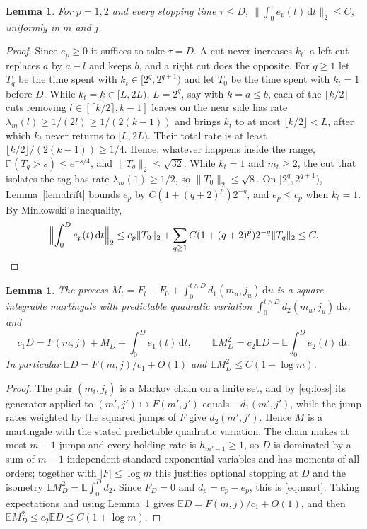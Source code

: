 \documentclass[11pt]{amsart}
\newtheorem{lemma}[theorem]{Lemma}
\theoremstyle{remark}
\numberwithin{equation}{section}
\newcommand{\E}{\mathbb E}
\newcommand{\Pp}{\mathbb P}
\newcommand{\dd}{\,\mathrm d}
\begin{document}
\begin{lemma}\label{lem:errors}
For $p=1,2$ and every stopping time $\tau\le D$, $\bigl\|\int_0^\tau e_p(t)\dd t\bigr\|_2\le C$, uniformly in $m$ and $j$.
\end{lemma}

\begin{proof}
Since $e_p\ge0$ it suffices to take $\tau=D$. A cut never increases $k_t$: a left cut replaces $a$ by $a-l$ and keeps $b$, and a right cut does the opposite. For $q\ge1$ let $T_q$ be the time spent with $k_t\in[2^q,2^{q+1})$ and let $T_0$ be the time spent with $k_t=1$ before $D$. While $k_t=k\in[L,2L)$, $L=2^q$, say with $k=a\le b$, each of the $\lfloor k/2\rfloor$ cuts removing $l\in[\lceil k/2\rceil,k-1]$ leaves on the near side has rate $\lambda_m(l)\ge1/(2l)\ge1/(2(k-1))$ and brings $k_t$ to at most $\lfloor k/2\rfloor<L$, after which $k_t$ never returns to $[L,2L)$. Their total rate is at least $\lfloor k/2\rfloor/(2(k-1))\ge1/4$. Hence, whatever happens inside the range, $\Pp(T_q>s)\le e^{-s/4}$, and $\|T_q\|_2\le\sqrt{32}$. While $k_t=1$ and $m_t\ge2$, the cut that isolates the tag has rate $\lambda_m(1)\ge1/2$, so $\|T_0\|_2\le\sqrt8$. On $[2^q,2^{q+1})$, Lemma~\ref{lem:drift} bounds $e_p$ by $C(1+(q+2)^p)2^{-q}$, and $e_p\le c_p$ when $k_t=1$. By Minkowski's inequality,
\[
\Bigl\|\int_0^De_p(t)\dd t\Bigr\|_2\le c_p\|T_0\|_2+\sum_{q\ge1}C(1+(q+2)^p)2^{-q}\|T_q\|_2\le C .\qedhere
\]
\end{proof}

\begin{lemma}\label{lem:mart}
The process $M_t=F_t-F_0+\int_0^{t\wedge D}d_1(m_u,j_u)\dd u$ is a square-integrable martingale with predictable quadratic variation $\int_0^{t\wedge D}d_2(m_u,j_u)\dd u$, and
\begin{equation}\label{eq:mart}
c_1D=F(m,j)+M_D+\int_0^De_1(t)\dd t,\qquad \E M_D^2=c_2\E D-\E\int_0^De_2(t)\dd t .
\end{equation}
In particular $\E D=F(m,j)/c_1+O(1)$ and $\E M_D^2\le C(1+\log m)$.
\end{lemma}

\begin{proof}
The pair $(m_t,j_t)$ is a Markov chain on a finite set, and by \eqref{eq:loss} its generator applied to $(m',j')\mapsto F(m',j')$ equals $-d_1(m',j')$, while the jump rates weighted by the squared jumps of $F$ give $d_2(m',j')$. Hence $M$ is a martingale with the stated predictable quadratic variation. The chain makes at most $m-1$ jumps and every holding rate is $h_{m'-1}\ge1$, so $D$ is dominated by a sum of $m-1$ independent standard exponential variables and has moments of all orders; together with $|F|\le\log m$ this justifies optional stopping at $D$ and the isometry $\E M_D^2=\E\int_0^Dd_2$. Since $F_D=0$ and $d_p=c_p-e_p$, this is \eqref{eq:mart}. Taking expectations and using Lemma~\ref{lem:errors} gives $\E D=F(m,j)/c_1+O(1)$, and then $\E M_D^2\le c_2\E D\le C(1+\log m)$.
\end{proof}
\end{document}
